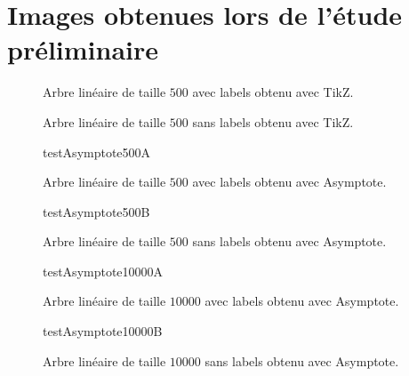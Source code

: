 \chapter{Images obtenues lors de l'étude préliminaire}

\begin{figure} \centering \resizebox {!}{10cm} {
}
\caption{Arbre linéaire de taille $500$ avec labels obtenu avec TikZ. \label{arbre500TikZA}}
\end{figure}


\begin{figure} \centering \resizebox {!}{10cm} {
}
\caption{Arbre linéaire de taille $500$ sans labels obtenu avec TikZ. \label{arbre500TikZB}}
\end{figure}


\begin{figure} \centering %
 {testAsymptote500A} %
\caption{Arbre linéaire de taille $500$ avec labels obtenu avec Asymptote. \label{arbre500AsyA}}
\end{figure}


\begin{figure} \centering %
 {testAsymptote500B} %
\caption{Arbre linéaire de taille $500$ sans labels obtenu avec Asymptote. \label{arbre500AsyB}}
\end{figure}


\begin{figure} \centering %
 {testAsymptote10000A}%
\caption{Arbre linéaire de taille $10000$ avec labels obtenu avec Asymptote. \label{arbre10000AsyA}}
\end{figure}


\begin{figure} \centering %
 {testAsymptote10000B}%
\caption{Arbre linéaire de taille $10000$ sans labels obtenu avec Asymptote. \label{arbre10000AsyB}}
\end{figure}


